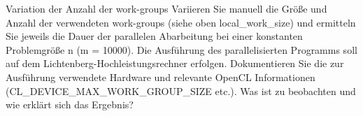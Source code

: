 \documentclass[
ngerman,
subtask=ruled %
]{tudaexercise}
\begin{document}
	\begin{task} {Variation der Anzahl der work-groups}
		Variieren Sie manuell die Größe und Anzahl der verwendeten work-groups (siehe oben local\_work\_size) und ermitteln
		Sie jeweils die Dauer der parallelen Abarbeitung bei einer konstanten Problemgröße n (m = 10000). Die Ausführung
		des parallelisierten Programms soll auf dem Lichtenberg-Hochleistungsrechner erfolgen. Dokumentieren Sie die zur
		Ausführung verwendete Hardware und relevante OpenCL Informationen (CL\_DEVICE\_MAX\_WORK\_GROUP\_SIZE etc.).
		Was ist zu beobachten und wie erklärt sich das Ergebnis?
	\end{task}

	
\end{document}
